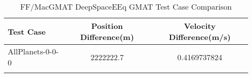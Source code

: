 \begin{table}[htbp!]
\centering
\caption{ FF/MacGMAT DeepSpaceEEq GMAT Test Case Comparison}
      \begin{tabular}{lcc}
      \hline\hline
          Test Case & Position Difference(m) & Velocity Difference(m/s) \\
         \hline
         AllPlanets-0-0-0 & 2222222.7 & 0.4169737824 \\
      \hline\hline
      \label{Table: DeepSpaceEEq GMAT Table} 
\end{tabular}
\end{table}
